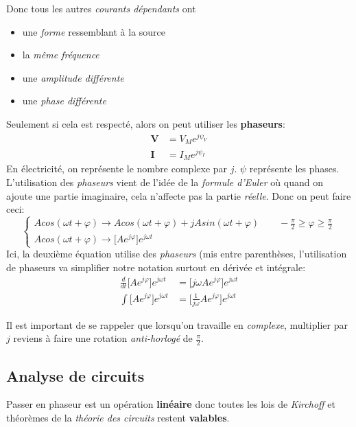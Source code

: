 \documentclass{report}
\begin{document}
Donc tous les autres \textit{courants dépendants} ont
\begin{itemize}
\item une \textit{forme} ressemblant à la source
\item la \textit{même fréquence}
\item une \textit{amplitude différente} 
\item une \textit{phase différente}
\end{itemize}
Seulement si cela est respecté, alors on peut utiliser les \textbf{phaseurs}:
\begin{align}
\textbf{V} &= V_M e^{j\psi_V}\\
\textbf{I} &= I_M e^{j\psi_I}
\end{align}
En électricité, on représente le nombre complexe par $j$. $\psi$ représente les phases.\\
L'utilisation des \textit{phaseurs} vient de l'idée de la \textit{formule d'Euler} où quand on ajoute une partie imaginaire, cela n'affecte pas la partie \textit{réelle}. Donc on peut faire ceci:
\begin{equation}
\begin{cases}
A cos(\omega t + \varphi) \rightarrow A cos(\omega t + \varphi) + j A sin(\omega t + \varphi) \qquad -\frac{\pi}{2}  \geq \varphi \geq \frac{\pi}{2} \\
A cos(\omega t + \varphi) \rightarrow \bigr[ Ae^{j\varphi} \bigr]e^{j\omega t}
\end{cases} 
\end{equation}
Ici, la deuxième équation utilise des \textit{phaseurs} (mis entre parenthèses, l'utilisation de phaseurs va simplifier notre notation surtout en dérivée et intégrale:
\begin{align}
\frac{d}{dt}\bigr[ Ae^{j\varphi} \bigr]e^{j\omega t} &= \bigr[ j \omega Ae^{j\varphi} \bigr]e^{j\omega t} \\
\int \bigr[ Ae^{j\varphi} \bigr]e^{j\omega t} &= \bigr[ \frac{1}{j \omega} Ae^{j\varphi} \bigr]e^{j\omega t}
\end{align}

Il est important de se rappeler que lorsqu'on travaille en \textit{complexe}, multiplier par $j$ reviens à faire une rotation \textit{anti-horlogé} de $\frac{\pi}{2}$.


\subsection{Analyse de circuits}
Passer en phaseur est un opération \textbf{linéaire} donc toutes les lois de \textit{Kirchoff} et théorèmes de la \textit{théorie des circuits} restent \textbf{valables}.
\end{document}
